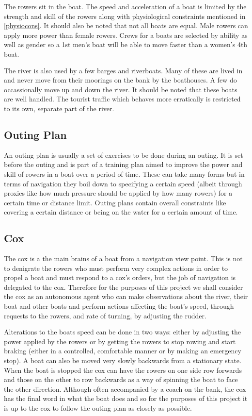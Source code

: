 The rowers sit in the boat. The speed and acceleration of a boat
is limited by the strength and skill of the rowers along with
physiological constraints mentioned in \ref{physiocons}. It should also be noted that
not all boats are equal. Male rowers can apply more power than female
rowers. Crews for a boats are selected by ability as well as gender so a 1st men's boat will
be able to move faster than a women's 4th boat.

The river is also used by a few barges and riverboats. Many of these
are lived in and never move from their moorings on the bank by the boathouses. A few do occassionally move
up and down the river. It should be noted that these boats are well
handled. The tourist traffic which behaves more erratically is
restricted to its own, separate part of the river.

\subsection{Outing Plan}
An outing plan is usually a set of exercises to be done during an
outing. It is set before the outing and is part of a training plan aimed
to improve the power and skill of rowers in a boat over a period of time. These can take many forms but in terms of navigation they boil
down to specifying a certain speed (albeit through proxies like
how much pressure should be applied by how many rowers) for a certain
time or distance limit. Outing plans contain overall
constraints like covering a certain distance or being on the water
for a certain amount of time.

\subsection{Cox}
The cox is a the main brains of a boat from a navigation view
point. This is not to denigrate the rowers who must perform very
complex actions in order to propel a boat and must respond to a cox's
orders, but the job of navigation
is delegated to the cox. Therefore for the purposes of this project we
shall consider the cox as an autonomous agent who can make observations about the
river, their boat and other boats and perform actions affecting the
boat's speed, through requests to the rowers, and rate of turning, by
adjusting the rudder.

Alterations to the boats speed can be done in two ways:
either by adjusting the power applied by the rowers or by getting the
rowers to stop rowing and start braking (either in a controlled, comfortable manner
or by making an emergency stop). A boat can also be moved very
slowly backwards from a stationary state. When the boat is stopped the
cox can have the rowers on one side row forwards and those on the other
to row backwards as a way of spinning the boat to face the other
direction. Although often accompanied by a coach on the bank, the cox
has the final word in what the boat does and so for the purposes of
this project it is up to the cox to follow the outing plan
as closely as possible.

